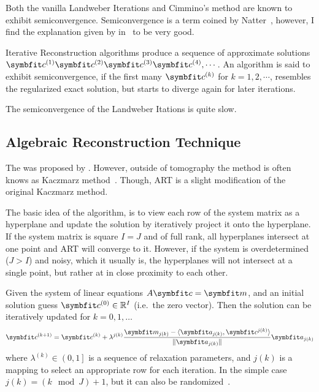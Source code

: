 Both the vanilla Landweber Iterations and Cimmino's method are known to exhibit semiconvergence.
Semiconvergence is a term coined by Natter~\cite{natterer_mathematics_1986}, however, I find the
explanation given by \citeauthor*{hansen_discrete_2010} in~\cite[Chapter~6]{hansen_discrete_2010}
to be very good.

\begin{definition}[Semiconvergence]\label{def:semiconvergence}
	Iterative Reconstruction algorithms produce a sequence of approximate solutions
	\(\mvec{c}^{(1)} \mvec{c}^{(2)}\mvec{c}^{(3)}\mvec{c}^{(4)}, \cdots\). An algorithm is said
	to exhibit semiconvergence, if the first many \(\mvec{c}^{(k)}\) for \(k = 1, 2, \cdots\),
	resembles the regularized exact solution, but starts to diverge again for later iterations.
\end{definition}

The semiconvergence of the Landweber Itations is quite slow.

\subsection{Algebraic Reconstruction Technique}\label{subsec:algebraic_reconstruction_technique}

The  was proposed by \citeauthor{gordon_algebraic_1970}\cite{gordon_algebraic_1970}.
However, outside of tomography the method is often knows as Kaczmarz
method~\cite{kaczmarz_approximate_1993}. Though, \gls{ART} is a slight modification of the original
Kaczmarz method.

The basic idea of the algorithm, is to view each row of the system matrix as a hyperplane and update
the solution by iteratively project it onto the hyperplane. If the system matrix is square \(I = J\)
and of full rank, all hyperplanes intersect at one point and \gls{ART} will converge to it. However, if
the system is overdetermined (\(J > I\)) and noisy, which it usually is, the hyperplanes will not
intersect at a single point, but rather at in close proximity to each other.

\begin{definition}\label{def:art}
	Given the system of linear equations \(A\mvec{c} = \mvec{m}\), and an initial solution guess
	\(\mvec{c}^{(0)} \in \mathbb{R}^I\) (i.e.\ the zero vector). Then the solution can be
	iteratively updated for
	\(k = 0, 1, \dots\)
	\[
		\mvec{c}^{(k+1)} = \mvec{c}^{(k)} + \lambda^{j(k)} \frac{\mvec{m}_{j(k)} - \langle \mvec{a}_{j(k)}, \mvec{c}^{j(k)} \rangle}{\norm{\mvec{a}_{j(k)}}}\mvec{a}_{j(k)}
	\]
	where \(\lambda^{(k)} \in \left(0, 1\right]\) is a sequence of relaxation parameters, and
	\(j(k)\) is a mapping to select an appropriate row for each iteration. In the simple case
	\(j(k) = (k \mod J) + 1\), but it can also be randomized~\cite{strohmer_randomized_2007}.
\end{definition}

